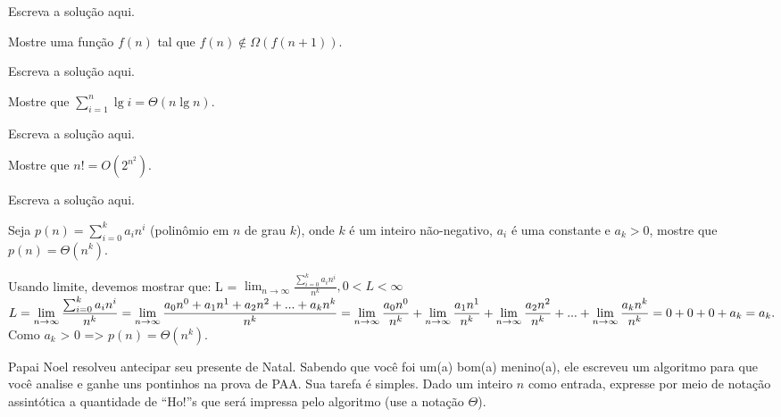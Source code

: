 \documentclass[a4paper]{exam}
\begin{document}
\begin{questions}
  \begin{solution}
    Escreva a solução aqui.
  \end{solution}
  \question Mostre uma função $f(n)$ tal que $f(n) \not\in \Omega(f(n+1))$.
  \begin{solution}
    Escreva a solução aqui.
  \end{solution}
  \question Mostre que $\sum_{i=1}^{n} \lg i = \Theta(n \lg n)$.
  \begin{solution}
    Escreva a solução aqui.
  \end{solution}
  \question Mostre que $n! = O(2^{n^2})$.
  \begin{solution}
    Escreva a solução aqui.
  \end{solution}
  \question Seja $p(n) = \sum_{i=0}^{k} a_{i}n^{i}$
  (polinômio em $n$ de grau $k$), onde $k$ é um inteiro não-negativo, $a_i$
  é uma constante e $a_k > 0$, mostre que $p(n) = \Theta(n^k)$.
  \begin{solution}
    Usando limite, devemos mostrar que: L = $\displaystyle\lim_{n\to\infty} \frac{\sum_{i=0}^{k} a_{i}n^{i}}{n^k}, 0 < L < \infty$\\

    $ L = \displaystyle\lim_{n\to\infty} \frac{\sum_{i=0}^{k} a_{i}n^{i}}{n^k} \\
        = \displaystyle\lim_{n\to\infty} \frac{a_0 n^0 + a_1 n^1 + a_2 n^2 + ... + a_k n^k}{n^k} \\
        = \displaystyle\lim_{n\to\infty} \frac{a_0 n^0}{n^k} + 
          \displaystyle\lim_{n\to\infty} \frac{a_1 n^1}{n^k} + 
          \displaystyle\lim_{n\to\infty} \frac{a_2 n^2}{n^k} + ... + 
          \displaystyle\lim_{n\to\infty} \frac{a_k n^k}{n^k} \\
        = 0 + 0 + 0 + a_k \\
        = a_k.$ \\
    Como $a_k$ > 0 => $p(n) = \Theta(n^k)$.
  \end{solution}
  \question Papai Noel resolveu antecipar seu presente de
  Natal. Sabendo que você foi um(a) bom(a) menino(a), ele escreveu um
  algoritmo para que você analise e ganhe uns pontinhos na prova de
  PAA. Sua tarefa é simples. Dado um inteiro $n$ como entrada,
  expresse por meio de notação assintótica a quantidade de ``Ho!''s
  que será impressa pelo algoritmo (use a notação $\Theta$).
  

\end{questions}
\end{document}
